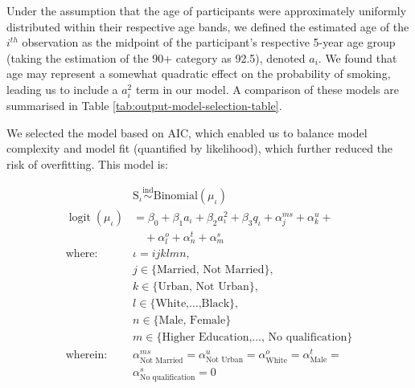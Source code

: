 \documentclass[
  11pt,
  twocolumn]{article}
\begin{document}
Under the assumption that the age of participants were approximately
uniformly distributed within their respective age bands, we defined the
estimated age of the \(i^{th}\) observation as the midpoint of the
participant's respective 5-year age group (taking the estimation of the
90+ category as 92.5), denoted \(a_i\). We found that age may represent
a somewhat quadratic effect on the probability of smoking, leading us to
include a \(a_i^2\) term in our model. A comparison of these models are
summarised in Table \ref{tab:output-model-selection-table}.

We selected the model based on AIC, which enabled us to balance model
complexity and model fit (quantified by likelihood), which further
reduced the risk of overfitting. This model is:

\begin{align*}
&\text{S}_{\iota} \overset{\text{ind}}{\sim} \text{Binomial}(\mu_{\iota}) \\
\mathop{\mathrm{logit}}(\mu_{\iota}) &= \beta_0 + \beta_1a_{\iota} + \beta_2a_{\iota}^2 + \beta_3q_{\iota} + \alpha^{ms}_j + \alpha^{u}_k + \\
&\quad + \alpha^{o}_l + \alpha^{t}_n + \alpha^{s}_m \\
\text{where: } & \iota = ijklmn, \\
&j \in \{\text{Married, Not Married}\}, \\
&k \in \{\text{Urban, Not Urban}\}, \\
&l \in \{\text{White,}\ldots\text{,Black}\}, \\
&n \in \{\text{Male, Female\}}\ \\
&m \in \{\text{Higher Education,}\ldots\text{, No qualification}\} \\
\text{wherein:} \ &\alpha^{ms}_{\text{Not Married}}=\alpha^u_{\text{Not Urban}} = 
\alpha^{o}_{\text{White}}= \alpha^{t}_{\text{Male}}= \\
&\alpha^{s}_{\text{No qualification}} = 0
\end{align*}
\end{document}

